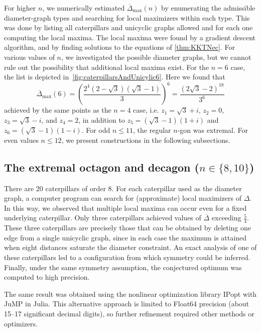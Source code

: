 \documentclass{article}
\theoremstyle{definition}
\let\le\leqslant
\let\leq\leqslant
\newcommand*{\oD}{\overline \Delta}
\begin{document}
For higher \(n\), we numerically estimated \(\overline{\Delta}_{\max}(n)\) by enumerating the admissible diameter-graph types and searching for local maximizers within each type. This was done by listing all caterpillars and unicyclic graphs allowed and for each one computing the local maxima.
The local maxima were found by a gradient descent algorithm, and by finding solutions to the equations of \cref{thm:KKTNec}.
For various values of \(n\), we investigated the possible diameter graphs, but we cannot rule out the possibility that additional local maxima exist.
For the \(n=6\) case, the list is depicted in~\cref{fig:caterpillarsAndUnicylic6}. Here we found that 
\[\overline{\Delta}_\max (6) = \left(\frac{2^{4} (2-\sqrt{3}) (\sqrt{3}-1)}{3}\right)^6 = \frac{(2\sqrt{3}-2)^{18}}{3^6}\]
achieved by the same points as the \(n=4\) case, i.e. \(z_1= \sqrt3 + i\), \(z_2=0\), \(z_3= \sqrt3 - i\),  and \(z_4=2\), in addition to \(z_5=(\sqrt{3}-1)(1+i)\)  and \(z_6=(\sqrt{3}-1)(1-i)\).
For odd $n \le 11$, the regular $n$-gon was extremal.
For even values $n\leq 12$, we present constructions in the following subsections.

\subsection{The extremal octagon and decagon ($n \in \{8,10\}$)}



There are $20$ caterpillars of order $8$.
For each caterpillar used as the diameter graph, a computer program can search for (approximate) local maximizers of $\Delta$.
In this way, we observed that multiple local maxima can occur even for a fixed underlying caterpillar.
Only three caterpillars achieved values of $\oD$ exceeding $\frac54$.
These three caterpillars are precisely those that can be obtained by deleting one edge from a single unicyclic graph, since in each case the maximum is attained when eight distances saturate the diameter constraint.
An exact analysis of one of these caterpillars led to a configuration from which symmetry could be inferred.
Finally, under the same symmetry assumption, the conjectured optimum was computed to high precision.

The same result was obtained using the nonlinear optimization library IPopt with JuMP in Julia.
This alternative approach is limited to Float64 precision (about 15--17 significant decimal digits), so further refinement required other methods or optimizers.
\end{document}
